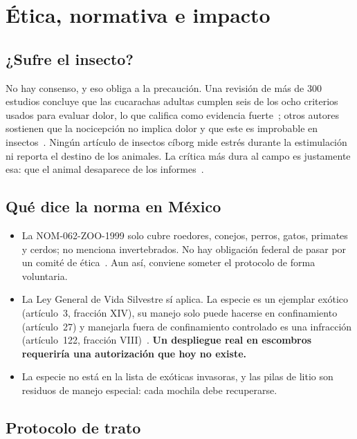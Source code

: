 \section{Ética, normativa e impacto}
\label{sec:etica}

\subsection{¿Sufre el insecto?}

No hay consenso, y eso obliga a la precaución. Una revisión de más de 300 estudios concluye que las
cucarachas adultas cumplen seis de los ocho criterios usados para evaluar dolor, lo que califica como
evidencia fuerte~\cite{gibbons2022,crump2023}; otros autores sostienen que la nocicepción no implica
dolor y que este es improbable en insectos~\cite{adamo2016}. Ningún artículo de insectos cíborg mide
estrés durante la estimulación ni reporta el destino de los animales. La crítica más dura al campo es
justamente esa: que el animal desaparece de los informes~\cite{dodd2014,mestre2024}.

\subsection{Qué dice la norma en México}

\begin{itemize}
  \item La NOM-062-ZOO-1999 solo cubre roedores, conejos, perros, gatos, primates y cerdos; no menciona
        invertebrados. No hay obligación federal de pasar por un comité de ética~\cite{nom062}. Aun así,
        conviene someter el protocolo de forma voluntaria.
  \item La Ley General de Vida Silvestre sí aplica. La especie es un ejemplar exótico (artículo~3,
        fracción XIV), su manejo solo puede hacerse en confinamiento (artículo~27) y manejarla fuera de
        confinamiento controlado es una infracción (artículo~122, fracción VIII)~\cite{lgvs}.
        \textbf{Un despliegue real en escombros requeriría una autorización que hoy no existe.}
  \item La especie no está en la lista de exóticas invasoras, y las pilas de litio son residuos de manejo
        especial: cada mochila debe recuperarse.
\end{itemize}

\subsection{Protocolo de trato}

